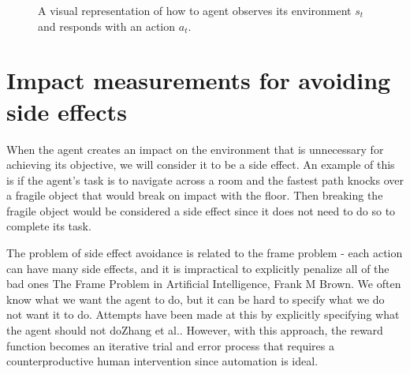 \documentclass[12pt,A4]{report}
\newcommand{\autobaj}{}
\theoremstyle{definition}
\begin{document}
\begin{figure}[H]
  
  \caption{A visual representation of how to agent observes its environment $s_t$ and responds with an action $a_t$.}
  \label{fig:RL}
\end{figure} 




\section{Impact measurements for avoiding side effects}
When the agent creates an impact on the environment that is unnecessary for achieving its objective, we will consider it to be a side effect. An example of this is if the agent's task is to navigate across a room and the fastest path knocks over a fragile object that would break on impact with the floor. Then breaking the fragile object would be considered a side effect since it does not need to do so to complete its task. 

The problem of side effect avoidance is related to the frame problem - each action can have many side effects, and it is impractical to explicitly penalize all of the bad ones \autobaj{The Frame Problem in Artificial Intelligence, Frank M Brown}. We often know what we want the agent to do, but it can be hard to specify what we do not want it to do. Attempts have been made at this by explicitly specifying what the agent should not do\autobaj{Zhang et al.}. However, with this approach, the reward function becomes an iterative trial and error process that requires a counterproductive human intervention since automation is ideal. 
\end{document}
